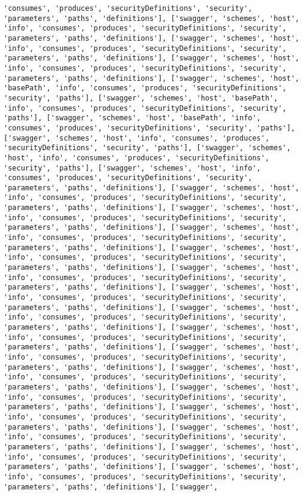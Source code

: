 \documentclass[11pt]{article}
\begin{document}
\begin{Verbatim}[commandchars=\\\{\}]
'consumes', 'produces', 'securityDefinitions', 'security', 'parameters', 'paths', 'definitions'], ['swagger', 'schemes', 'host', 'info', 'consumes', 'produces', 'securityDefinitions', 'security', 'parameters', 'paths', 'definitions'], ['swagger', 'schemes', 'host', 'info', 'consumes', 'produces', 'securityDefinitions', 'security', 'parameters', 'paths', 'definitions'], ['swagger', 'schemes', 'host', 'info', 'consumes', 'produces', 'securityDefinitions', 'security', 'parameters', 'paths', 'definitions'], ['swagger', 'schemes', 'host', 'basePath', 'info', 'consumes', 'produces', 'securityDefinitions', 'security', 'paths'], ['swagger', 'schemes', 'host', 'basePath', 'info', 'consumes', 'produces', 'securityDefinitions', 'security', 'paths'], ['swagger', 'schemes', 'host', 'basePath', 'info', 'consumes', 'produces', 'securityDefinitions', 'security', 'paths'], ['swagger', 'schemes', 'host', 'info', 'consumes', 'produces', 'securityDefinitions', 'security', 'paths'], ['swagger', 'schemes', 'host', 'info', 'consumes', 'produces', 'securityDefinitions', 'security', 'paths'], ['swagger', 'schemes', 'host', 'info', 'consumes', 'produces', 'securityDefinitions', 'security', 'parameters', 'paths', 'definitions'], ['swagger', 'schemes', 'host', 'info', 'consumes', 'produces', 'securityDefinitions', 'security', 'parameters', 'paths', 'definitions'], ['swagger', 'schemes', 'host', 'info', 'consumes', 'produces', 'securityDefinitions', 'security', 'parameters', 'paths', 'definitions'], ['swagger', 'schemes', 'host', 'info', 'consumes', 'produces', 'securityDefinitions', 'security', 'parameters', 'paths', 'definitions'], ['swagger', 'schemes', 'host', 'info', 'consumes', 'produces', 'securityDefinitions', 'security', 'parameters', 'paths', 'definitions'], ['swagger', 'schemes', 'host', 'info', 'consumes', 'produces', 'securityDefinitions', 'security', 'parameters', 'paths', 'definitions'], ['swagger', 'schemes', 'host', 'info', 'consumes', 'produces', 'securityDefinitions', 'security', 'parameters', 'paths', 'definitions'], ['swagger', 'schemes', 'host', 'info', 'consumes', 'produces', 'securityDefinitions', 'security', 'parameters', 'paths', 'definitions'], ['swagger', 'schemes', 'host', 'info', 'consumes', 'produces', 'securityDefinitions', 'security', 'parameters', 'paths', 'definitions'], ['swagger', 'schemes', 'host', 'info', 'consumes', 'produces', 'securityDefinitions', 'security', 'parameters', 'paths', 'definitions'], ['swagger', 'schemes', 'host', 'info', 'consumes', 'produces', 'securityDefinitions', 'security', 'parameters', 'paths', 'definitions'], ['swagger', 'schemes', 'host', 'info', 'consumes', 'produces', 'securityDefinitions', 'security', 'parameters', 'paths', 'definitions'], ['swagger', 'schemes', 'host', 'info', 'consumes', 'produces', 'securityDefinitions', 'security', 'parameters', 'paths', 'definitions'], ['swagger', 'schemes', 'host', 'info', 'consumes', 'produces', 'securityDefinitions', 'security', 'parameters', 'paths', 'definitions'], ['swagger', 'schemes', 'host', 'info', 'consumes', 'produces', 'securityDefinitions', 'security', 'parameters', 'paths', 'definitions'], ['swagger', 'schemes', 'host', 'info', 'consumes', 'produces', 'securityDefinitions', 'security', 'parameters', 'paths', 'definitions'], ['swagger', 
\end{Verbatim}
\end{document}
